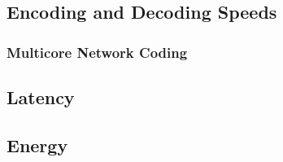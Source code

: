 \label{sec:metrics}
\subsection{Encoding and Decoding Speeds}

\subsubsection{Multicore Network Coding}
\label{subs:multicore-network-coding}

\subsection{Latency}
\subsection{Energy}
